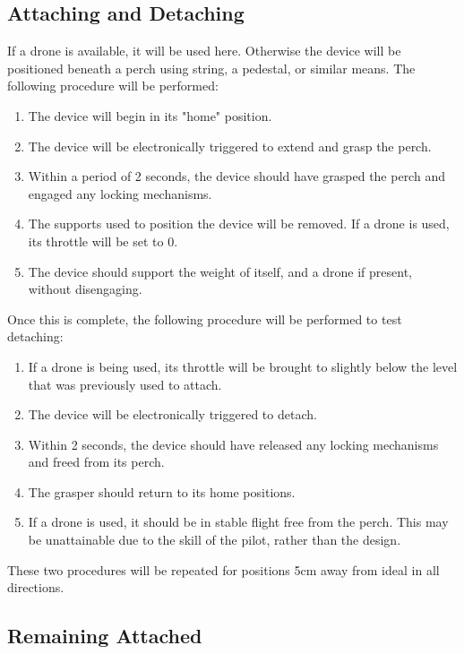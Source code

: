\subsection{Attaching and Detaching}

If a drone is available, it will be used here. Otherwise the device will be positioned beneath a perch using string, a pedestal,
or similar means. The following procedure will be performed:
\begin{enumerate}
    \item The device will begin in its "home" position.
    \item The device will be electronically triggered to extend and grasp the perch.
    \item Within a period of 2 seconds, the device should have grasped the perch and engaged any locking mechanisms.
    \item The supports used to position the device will be removed. If a drone is used, its throttle will be set to 0.
    \item The device should support the weight of itself, and a drone if present, without disengaging.
\end{enumerate}

Once this is complete, the following procedure will be performed to test detaching:
\begin{enumerate}
    \item If a drone is being used, its throttle will be brought to slightly below the level that was previously used to attach.
    \item The device will be electronically triggered to detach.
    \item Within 2 seconds, the device should have released any locking mechanisms and freed from its perch.
    \item The grasper should return to its home positions.
    \item If a drone is used, it should be in stable flight free from the perch. This may be unattainable due to the skill of the pilot,
            rather than the design.
\end{enumerate}

These two procedures will be repeated for positions 5cm away from ideal in all directions.


\subsection{Remaining Attached}

